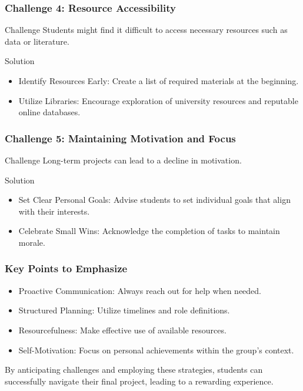 \documentclass[aspectratio=169]{beamer}
\begin{document}
\begin{frame}[fragile]
    \frametitle{Challenge 4: Resource Accessibility}
    \begin{block}{Challenge}
        Students might find it difficult to access necessary resources such as data or literature.
    \end{block}
    \begin{block}{Solution}
        \begin{itemize}
            \item Identify Resources Early: Create a list of required materials at the beginning.
            \item Utilize Libraries: Encourage exploration of university resources and reputable online databases.
        \end{itemize}
    \end{block}
\end{frame}

\begin{frame}[fragile]
    \frametitle{Challenge 5: Maintaining Motivation and Focus}
    \begin{block}{Challenge}
        Long-term projects can lead to a decline in motivation.
    \end{block}
    \begin{block}{Solution}
        \begin{itemize}
            \item Set Clear Personal Goals: Advise students to set individual goals that align with their interests.
            \item Celebrate Small Wins: Acknowledge the completion of tasks to maintain morale.
        \end{itemize}
    \end{block}
\end{frame}

\begin{frame}[fragile]
    \frametitle{Key Points to Emphasize}
    \begin{itemize}
        \item Proactive Communication: Always reach out for help when needed.
        \item Structured Planning: Utilize timelines and role definitions.
        \item Resourcefulness: Make effective use of available resources.
        \item Self-Motivation: Focus on personal achievements within the group's context.
    \end{itemize}
    By anticipating challenges and employing these strategies, students can successfully navigate their final project, leading to a rewarding experience.
\end{frame}
\end{document}
